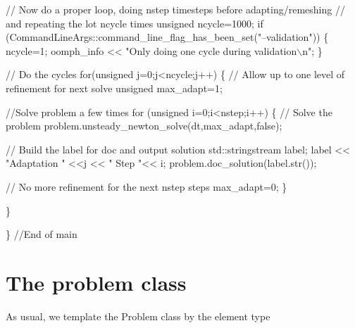 \begin{DoxyCodeInclude}
 \textcolor{comment}{// Now do a proper loop, doing nstep timesteps before adapting/remeshing}
 \textcolor{comment}{// and repeating the lot ncycle times}
 \textcolor{keywordtype}{unsigned} ncycle=1000;
 \textcolor{keywordflow}{if} (CommandLineArgs::command\_line\_flag\_has\_been\_set(\textcolor{stringliteral}{"--validation"}))
  \{
   ncycle=1;
   oomph\_info << \textcolor{stringliteral}{"Only doing one cycle during validation\(\backslash\)n"};
  \}

 \textcolor{comment}{// Do the cycles}
 \textcolor{keywordflow}{for}(\textcolor{keywordtype}{unsigned} j=0;j<ncycle;j++)
  \{       
   \textcolor{comment}{// Allow up to one level of refinement for next solve}
   \textcolor{keywordtype}{unsigned} max\_adapt=1;

   \textcolor{comment}{//Solve problem a few times}
   \textcolor{keywordflow}{for} (\textcolor{keywordtype}{unsigned} i=0;i<nstep;i++)
    \{     
     \textcolor{comment}{// Solve the problem}
     problem.unsteady\_newton\_solve(dt,max\_adapt,\textcolor{keyword}{false}); 


     \textcolor{comment}{// Build the label for doc and output solution}
     std::stringstream label;
     label << \textcolor{stringliteral}{"Adaptation "} <<j << \textcolor{stringliteral}{" Step "}<< i;
     problem.doc\_solution(label.str());

     \textcolor{comment}{// No more refinement for the next nstep steps}
     max\_adapt=0;
    \}

  \}


\} \textcolor{comment}{//End of main}

\end{DoxyCodeInclude}




 

\hypertarget{index_problem}{}\section{The problem class}\label{index_problem}
As usual, we template the Problem class by the element type

